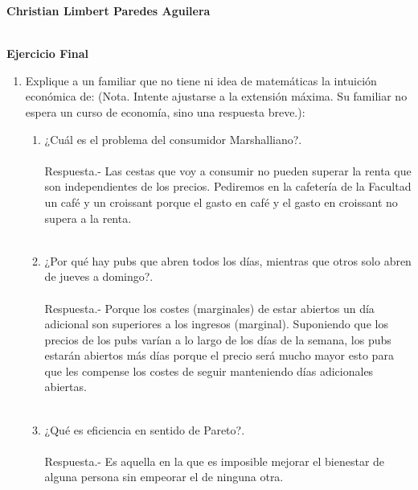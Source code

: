 \textbf{Christian Limbert Paredes Aguilera}\\\\

\begin{center}
    \textbf{\Large Ejercicio Final}
\end{center}
\vspace{1cm}

\begin{enumerate}

\item Explique a un familiar que no tiene ni idea de matemáticas la intuición económica de: (Nota. Intente ajustarse a la extensión máxima. Su familiar no espera un curso de economía, sino una respuesta breve.):

    \begin{enumerate}[\bfseries 1.]

	\item ¿Cuál es el problema del consumidor Marshalliano?.\\\\
	    Respuesta.-\; Las cestas que voy a consumir no pueden superar la renta que son independientes de los precios. Pediremos en la cafetería de la Facultad un café y un croissant porque el gasto en café y el gasto en croissant no supera a la renta.\\\\

	\item  ¿Por qué hay pubs que abren todos los días, mientras que otros solo abren de jueves a domingo?.\\\\
	    Respuesta.-\; Porque los costes (marginales) de estar abiertos un día adicional son superiores a los ingresos (marginal). Suponiendo que los precios de los pubs varían a lo largo de los días de la semana, los pubs estarán abiertos más días porque el precio será mucho mayor esto para que les compense los costes de seguir manteniendo días adicionales abiertas.\\\\

	\item  ¿Qué es eficiencia en sentido de Pareto?.\\\\
	    Respuesta.-\; Es aquella en la que es imposible mejorar el bienestar de alguna persona sin empeorar el de ninguna otra.\\\\


\end{enumerate}
\end{enumerate}
